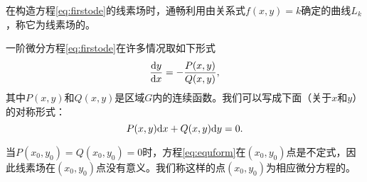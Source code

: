 在构造方程\eqref{eq:firstode}的线素场时，通畅利用由关系式$f(x,y)=k$确定的曲线$L_k$，称它为线素场的。

一阶微分方程\eqref{eq:firstode}在许多情况取如下形式
\begin{equation}\label{eq:equform}
    \frac{\mathrm{d} y}{\mathrm{d} x}=-\dfrac{P(x,y)}{Q(x,y)},
\end{equation}
其中$P(x,y)$和$Q(x,y)$是区域$G$内的连续函数。我们可以写成下面（关于$x$和$y$）的对称形式：
\begin{equation}\label{eq:equform2}
    P(x,y)\mathrm{d} x+Q(x,y)\mathrm{d} y=0.
\end{equation}

当$P(x_0,y_0)=Q(x_0,y_0)=0$时，方程\eqref{eq:equform}在$(x_0,y_0)$点是不定式，因此线素场在$(x_0,y_0)$点没有意义。我们称这样的点$(x_0,y_0)$为相应微分方程的。
